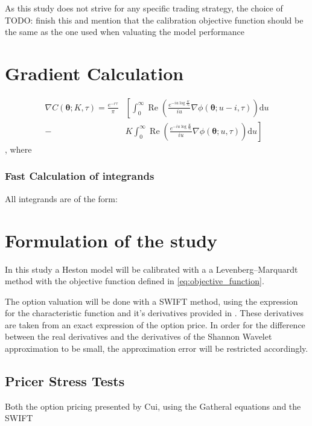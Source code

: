 \documentclass[12,twoside]{mammeTFM}
\theoremstyle{definition}
\theoremstyle{remark}
\begin{document}
As this study does not strive for any specific trading strategy, the choice of TODO: finish this and mention that the calibration objective function should be the same as the one used when valuating the model performance \cite{chr02}


\section{Gradient Calculation} \label{sec:gradient}

\begin{equation}
\begin{aligned}
\nabla C(\boldsymbol{\theta} ; K, \tau)=\frac{e^{-r \tau}}{\pi} &\left[\int_{0}^{\infty} \operatorname{Re}\left(\frac{e^{-i u \log \frac{K}{s_{0}}}}{i u} \nabla \phi(\boldsymbol{\theta} ; u-i, \tau)\right) \mathrm{d} u\right.\\
-&\left.K \int_{0}^{\infty} \operatorname{Re}\left(\frac{e^{-i u \log \frac{K}{s_{0}}}}{i u} \nabla \phi(\boldsymbol{\theta} ; u, \tau)\right) \mathrm{d} u\right]
\end{aligned}
\end{equation}
, where 

\subsubsection{Fast Calculation of integrands}
All integrands are of the form: %

\section{Formulation of the study}

In this study a Heston model will be calibrated with a a Levenberg–Marquardt method with the objective function defined in \ref{eq:objective_function}. 

The option valuation will be done with a SWIFT method, using the expression for the characteristic function and it's derivatives provided in \cite{cui17}. These derivatives are taken from an exact expression of the option price. In order for the difference between the real derivatives and the derivatives of the Shannon Wavelet approximation to be small, the approximation error will be restricted accordingly.

\subsection{Pricer Stress Tests}
Both the option pricing presented by Cui, using the Gatheral equations \cite{cui17} and the SWIFT
\end{document}
